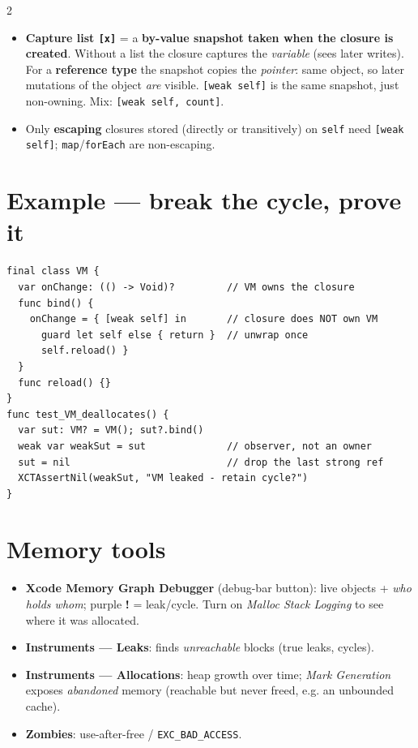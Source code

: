 \documentclass[8pt]{extarticle}
\begin{document}
\begin{multicols}{2}
\begin{itemize}
        children strongly, \texttt{child.parent}, \texttt{list.prev} are
        \texttt{weak}; (4) \textbf{Timer} — the run loop retains it: also
        \texttt{invalidate()}.
  \item \textbf{Capture list \texttt{[x]}} = a \textbf{by-value snapshot taken
        when the closure is created}. Without a list the closure captures the
        \emph{variable} (sees later writes). For a \textbf{reference type} the
        snapshot copies the \emph{pointer}: same object, so later mutations of
        the object \emph{are} visible. \texttt{[weak self]} is the same
        snapshot, just non-owning. Mix: \texttt{[weak self, count]}.
  \item Only \textbf{escaping} closures stored (directly or transitively) on
        \texttt{self} need \texttt{[weak self]}; \texttt{map}/\texttt{forEach}
        are non-escaping.
\end{itemize}

\section{Example — break the cycle, prove it}
\begin{lstlisting}[language=SwiftSheet]
final class VM {
  var onChange: (() -> Void)?         // VM owns the closure
  func bind() {
    onChange = { [weak self] in       // closure does NOT own VM
      guard let self else { return }  // unwrap once
      self.reload() }
  }
  func reload() {}
}
func test_VM_deallocates() {
  var sut: VM? = VM(); sut?.bind()
  weak var weakSut = sut              // observer, not an owner
  sut = nil                           // drop the last strong ref
  XCTAssertNil(weakSut, "VM leaked - retain cycle?")
}
\end{lstlisting}

\section{Memory tools}
\begin{itemize}
  \item \textbf{Xcode Memory Graph Debugger} (debug-bar button): live objects +
        \emph{who holds whom}; purple \textbf{!} = leak/cycle. Turn on
        \emph{Malloc Stack Logging} to see where it was allocated.
  \item \textbf{Instruments — Leaks}: finds \emph{unreachable} blocks (true leaks, cycles).
  \item \textbf{Instruments — Allocations}: heap growth over time;
        \emph{Mark Generation} exposes \emph{abandoned} memory (reachable but
        never freed, e.g. an unbounded cache).
  \item \textbf{Zombies}: use-after-free / \texttt{EXC\_BAD\_ACCESS}.
\end{itemize}


\end{multicols}
\end{document}
